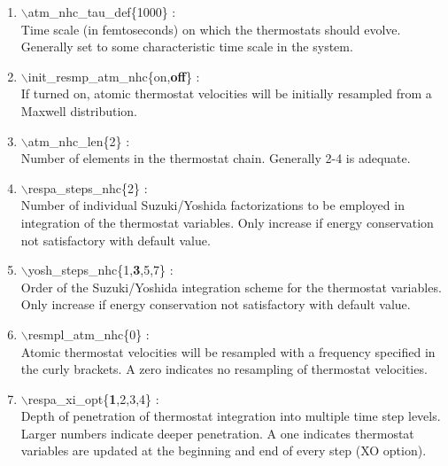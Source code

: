 \documentclass[12pt,titlepage]{article}
\begin{document}
\begin{enumerate}
 \vspace{0.15in} 
 \item   $\backslash$atm\_nhc\_tau\_def\{1000\} : \\
  Time scale (in femtoseconds) on which the thermostats should evolve. 
  Generally set to some characteristic time scale in the system.

 \vspace{0.15in} 
 \item   $\backslash$init\_resmp\_atm\_nhc\{on,{\bf off}\} : \\
   If turned on, atomic thermostat velocities will be initially resampled from
   a Maxwell distribution.

 \vspace{0.15in} 
 \item   $\backslash$atm\_nhc\_len\{2\} : \\
   Number of elements in the thermostat chain.  Generally 2-4 is adequate.

 \vspace{0.15in}
 \item   $\backslash$respa\_steps\_nhc\{2\} : \\
     Number of individual Suzuki/Yoshida factorizations to be employed in
     integration of the thermostat variables.  Only
     increase if energy conservation not satisfactory with default value.

 \vspace{0.15in}
 \item   $\backslash$yosh\_steps\_nhc\{1,{\bf 3},5,7\} : \\
   Order of the Suzuki/Yoshida integration scheme for the thermostat
   variables.  Only increase if energy conservation not satisfactory with
   default value.

 \vspace{0.15in} 
 \item   $\backslash$resmpl\_atm\_nhc\{0\} : \\
   Atomic thermostat velocities will be resampled with a frequency specified
   in the curly brackets.  A zero indicates no resampling of thermostat
   velocities.

 \vspace{0.15in}
 \item   $\backslash$respa\_xi\_opt\{{\bf 1},2,3,4\} : \\
   Depth of penetration of thermostat integration into multiple time step
   levels.  Larger numbers indicate deeper penetration.  A one indicates
   thermostat variables are updated at the beginning and end of 
   every step (XO option).


\end{enumerate}
\end{document}

